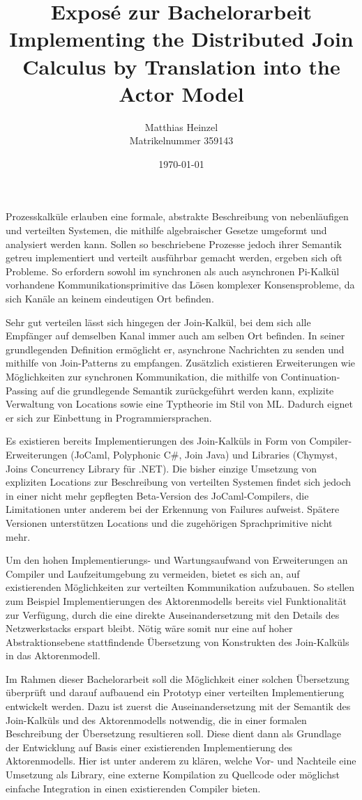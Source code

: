 \documentclass[12pt]{article}
\title{{\large Expos\'e zur Bachelorarbeit}
\\ Implementing the Distributed Join Calculus by Translation into the Actor Model
%
}
\author{Matthias Heinzel\\Matrikelnummer 359143}
\date{\today}
\begin{document}
\maketitle

Prozesskalküle erlauben eine formale, abstrakte Beschreibung von nebenläufigen und verteilten Systemen, die mithilfe algebraischer Gesetze umgeformt und analysiert werden kann.
Sollen so beschriebene Prozesse jedoch ihrer Semantik getreu implementiert und verteilt ausführbar gemacht werden, ergeben sich oft Probleme.
So erfordern sowohl im synchronen als auch asynchronen Pi-Kalkül vorhandene Kommunikationsprimitive das Lösen komplexer Konsensprobleme, da sich Kanäle an keinem eindeutigen Ort befinden.

Sehr gut verteilen lässt sich hingegen der Join-Kalkül, bei dem sich alle Empfänger auf demselben Kanal immer auch am selben Ort befinden.
In seiner grundlegenden Definition ermöglicht er, asynchrone Nachrichten zu senden und mithilfe von Join-Patterns zu empfangen.
Zusätzlich existieren Erweiterungen wie Möglichkeiten zur synchronen Kommunikation, die mithilfe von Continuation-Passing auf die grundlegende Semantik zurückgeführt werden kann, explizite Verwaltung von Locations sowie eine Typtheorie im Stil von ML. Dadurch eignet er sich zur Einbettung in Programmiersprachen.

Es existieren bereits Implementierungen des Join-Kalküls in Form von Compiler-Erweiterungen (JoCaml, Polyphonic C\#, Join Java) und Libraries (Chymyst, Joins Concurrency Library für .NET).
Die bisher einzige Umsetzung von expliziten Locations zur Beschreibung von verteilten Systemen findet sich jedoch in einer nicht mehr gepflegten Beta-Version des JoCaml-Compilers, die Limitationen unter anderem bei der Erkennung von Failures aufweist.
Spätere Versionen unterstützen Locations und die zugehörigen Sprachprimitive nicht mehr.

Um den hohen Implementierungs- und Wartungsaufwand von Erweiterungen an Compiler und Laufzeitumgebung zu vermeiden, bietet es sich an, auf existierenden Möglichkeiten zur verteilten Kommunikation aufzubauen.
So stellen zum Beispiel Implementierungen des Aktorenmodells bereits viel Funktionalität zur Verfügung, durch die eine direkte Auseinandersetzung mit den Details des Netzwerkstacks erspart bleibt.
Nötig wäre somit nur eine auf hoher Abstraktionsebene stattfindende Übersetzung von Konstrukten des Join-Kalküls in das Aktorenmodell.

Im Rahmen dieser Bachelorarbeit soll die Möglichkeit einer solchen Übersetzung überprüft und darauf aufbauend ein Prototyp einer verteilten Implementierung entwickelt werden.
Dazu ist zuerst die Auseinandersetzung mit der Semantik des Join-Kalküls und des Aktorenmodells notwendig, die in einer formalen Beschreibung der Übersetzung resultieren soll.
Diese dient dann als Grundlage der Entwicklung auf Basis einer existierenden Implementierung des Aktorenmodells.
Hier ist unter anderem zu klären, welche Vor- und Nachteile eine Umsetzung als Library, eine externe Kompilation zu Quellcode oder möglichst einfache Integration in einen existierenden Compiler bieten.
\end{document}
